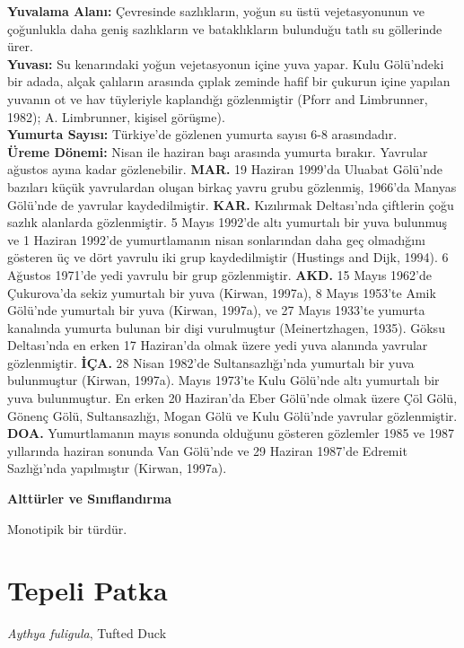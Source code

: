 \documentclass[
  a4paper,
  DIV=11,
  numbers=noendperiod]{scrartcl}
\begin{document}
\textbf{Yuvalama Alanı:} Çevresinde sazlıkların, yoğun su üstü
vejetasyonunun ve çoğunlukla daha geniş sazlıkların ve bataklıkların
bulunduğu tatlı su göllerinde ürer.\\
\textbf{Yuvası:} Su kenarındaki yoğun vejetasyonun içine yuva yapar.
Kulu Gölü'ndeki bir adada, alçak çalıların arasında çıplak zeminde hafif
bir çukurun içine yapılan yuvanın ot ve hav tüyleriyle kaplandığı
gözlenmiştir (Pforr and Limbrunner, 1982); A. Limbrunner, kişisel
görüşme).\\
\textbf{Yumurta Sayısı:} Türkiye'de gözlenen yumurta sayısı 6-8
arasındadır.\\
\textbf{Üreme Dönemi:} Nisan ile haziran başı arasında yumurta bırakır.
Yavrular ağustos ayına kadar gözlenebilir. \textbf{MAR.} 19 Haziran
1999'da Uluabat Gölü'nde bazıları küçük yavrulardan oluşan birkaç yavru
grubu gözlenmiş, 1966'da Manyas Gölü'nde de yavrular kaydedilmiştir.
\textbf{KAR.} Kızılırmak Deltası'nda çiftlerin çoğu sazlık alanlarda
gözlenmiştir. 5 Mayıs 1992'de altı yumurtalı bir yuva bulunmuş ve 1
Haziran 1992'de yumurtlamanın nisan sonlarından daha geç olmadığını
gösteren üç ve dört yavrulu iki grup kaydedilmiştir (Hustings and Dijk,
1994). 6 Ağustos 1971'de yedi yavrulu bir grup gözlenmiştir.
\textbf{AKD.} 15 Mayıs 1962'de Çukurova'da sekiz yumurtalı bir yuva
(Kirwan, 1997a), 8 Mayıs 1953'te Amik Gölü'nde yumurtalı bir yuva
(Kirwan, 1997a), ve 27 Mayıs 1933'te yumurta kanalında yumurta bulunan
bir dişi vurulmuştur (Meinertzhagen, 1935). Göksu Deltası'nda en erken
17 Haziran'da olmak üzere yedi yuva alanında yavrular gözlenmiştir.
\textbf{İÇA.} 28 Nisan 1982'de Sultansazlığı'nda yumurtalı bir yuva
bulunmuştur (Kirwan, 1997a). Mayıs 1973'te Kulu Gölü'nde altı yumurtalı
bir yuva bulunmuştur. En erken 20 Haziran'da Eber Gölü'nde olmak üzere
Çöl Gölü, Gönenç Gölü, Sultansazlığı, Mogan Gölü ve Kulu Gölü'nde
yavrular gözlenmiştir. \textbf{DOA.} Yumurtlamanın mayıs sonunda
olduğunu gösteren gözlemler 1985 ve 1987 yıllarında haziran sonunda Van
Gölü'nde ve 29 Haziran 1987'de Edremit Sazlığı'nda yapılmıştır (Kirwan,
1997a).

\textbf{Alttürler ve Sınıflandırma}

Monotipik bir türdür.

\section{Tepeli Patka}\label{tepeli-patka}

\emph{Aythya fuligula}, Tufted Duck
\end{document}
